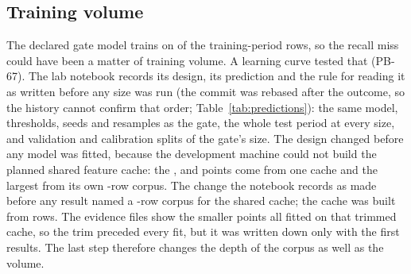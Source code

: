 \subsection{Training volume}
\label{sec:volume}

The declared gate model trains on \nTrainUsed{} of the \nTrainRows{} training-period rows, so the recall
miss could have been a matter of training volume. A learning curve tested that (PB-67). The lab notebook
records its design, its prediction and the rule for reading it as written before any size was run
(the commit was rebased after the outcome, so the history cannot confirm that order;
Table~\ref{tab:predictions}): the same model, thresholds, seeds and resamples as the gate, the whole test period at every
size, and validation and calibration splits of the gate's size. The design changed before any model
was fitted, because the development machine could not build the planned shared feature cache: the
\nLcTrainA{}, \nLcTrainB{} and \nLcTrainC{} points come from one cache and the largest from its own
\nLcCorpusLarge{}-row corpus. The change the notebook records as made before any result named a
\nLcCorpusPlanned{}-row corpus for the shared cache; the cache was built from \nLcCorpusSmall{} rows.
The evidence files show the smaller points all fitted on that trimmed cache, so the trim preceded
every fit, but it was written down only with the first results. The last step therefore changes the depth of the corpus as well as
the volume.

